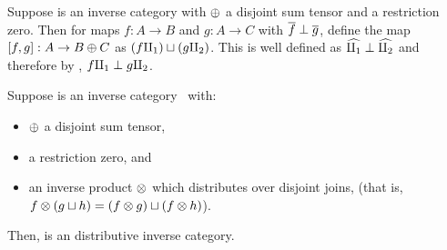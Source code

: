 \begin{definition}\label{def:join_of_perp_rst_maps}
  Suppose \X is an inverse category with $\oplus$ a disjoint sum tensor and a restriction zero. Then
  for maps $f:A \to B$ and $g:A \to C$ with $\overline{f} \perp \overline{g}$, define the map $[f,g]:A \to
  B\oplus C$ as $(f \amalg_{1}) \sqcup (g \amalg_{2})$. This is well defined as $\widehat{\amalg_{1}} \perp \widehat{\amalg_{2}}$ and
  therefore by , $f\amalg_{1} \perp g\amalg_{2}$.
\end{definition}

\begin{lemma}
  Suppose \X is an inverse category \X\ with:
  \begin{itemize}
    \item $\oplus$ a disjoint sum tensor,
    \item a restriction zero, and
    \item an inverse product $\otimes$ which distributes over disjoint joins, (that is,
      $f\otimes(g\sqcup h) = (f\otimes g) \sqcup (f\otimes h)$).
  \end{itemize}
  Then, \X is an distributive inverse  category.
\end{lemma}
